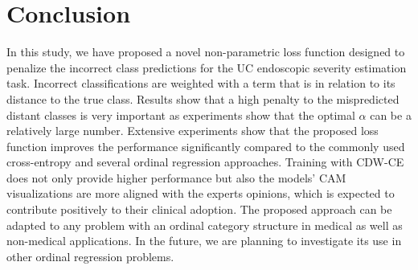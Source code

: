 \documentclass[runningheads]{llncs}
\begin{document}
\section{Conclusion}

In this study, we have proposed a novel non-parametric loss function designed to penalize the incorrect class predictions for the UC endoscopic severity estimation task. Incorrect classifications are weighted with a term that is in relation to its distance to the true class. Results show that a high penalty to the mispredicted distant classes is very important as experiments show that the optimal $\alpha$ can be a relatively large number. Extensive experiments show that the proposed loss function improves the performance significantly compared to the commonly used cross-entropy and several ordinal regression approaches. Training with CDW-CE does not only provide higher performance but also the models' CAM visualizations are more aligned with the experts opinions, which is expected to contribute positively to their clinical adoption. The proposed approach can be adapted to any problem with an ordinal category structure in medical as well as non-medical applications. In the future, we are planning to investigate its use in other ordinal regression problems.





\end{document}
